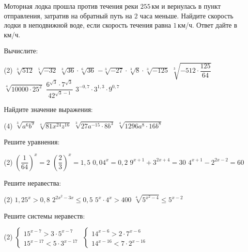 \begin{class}[number=7]
\begin{listofex}
		\item Моторная лодка прошла против течения реки \(255\) км и вернулась в пункт отправления, затратив на обратный путь на \(2\) часа меньше. Найдите скорость лодки в неподвижной воде, если скорость течения равна \(1\) км/ч. Ответ дайте в км/ч.
	\end{listofex}
\end{class}
	
\begin{exam}
	\begin{listofex}
		\item Вычислите:
		\begin{tasks}(2)
			\task \( \sqrt[3]{512} \)
			\task \( \sqrt[5]{-32} \)
			\task \( \sqrt[3]{36} \cdot \sqrt[6]{36} \)
			\task \( -\sqrt[3]{-27} \cdot \sqrt[3]{8} \cdot \sqrt[3]{-125} \)
			\task \( \sqrt[3]{-512 \cdot \dfrac{125}{64}} \)
			\task \( \sqrt[4]{10000 \cdot 25^2} \)
			\task \( \dfrac{6^{\sqrt{3}}\cdot7^{\sqrt{3}}}{42^{\sqrt{3}-1}} \)
			\task \( 3^{-0,7}\cdot 3^{1,3} \cdot 9^{0,7}\)
		\end{tasks}
			\item Найдите значение выражения:
		\begin{tasks}(4)
			\task \( \sqrt[3]{a^6b^9} \)
			\task \( \sqrt[4]{81x^{24}z^{16}} \)
			\task \( \sqrt[3]{27a^{-15} \cdot 8b^3} \)
			\task \( \sqrt[4]{1296a^8 \cdot 16 b^8} \)
		\end{tasks}
		\item Решите уравнения:
		\begin{tasks}(2)
			\task \( \left( \dfrac{1}{64} \right)^x=2  \)
			\task \( \left( \dfrac{2}{3} \right)^x=1,5 \)
			\task \( 0,04^x=0,2 \)
			\task \( 9^{x+1}+3^{2x+4}=30 \)
			\task \( 4^{x+1}-2^{2x-2}=60 \)
		\end{tasks}
		\item Решите неравества:
		\begin{tasks}(2)
			\task \( 1,25^x > 0,8 \)
			\task \( 2^{2x^2-3x} \le 0,5 \)
			\task \( 5^x \cdot 4^x > 400 \)
			\task \( \sqrt[4]{5^{x^2-4}}\le 5^{x-2} \)
		\end{tasks}
		\item Решите системы неравеств:
		\begin{tasks}(2)
			\task \( \begin{cases} 15^{x-7}> 3 \cdot 5^{x-7} \\ 15^{x-17} < 5 \cdot 3^{x-17} \end{cases} \)
			\task \( \begin{cases} 14^{x-6} > 2 \cdot 7^{x-6} \\ 14^{x-16} < 7 \cdot 2^{x-16} \end{cases} \)
		\end{tasks}
		

\end{listofex}
\end{exam}
